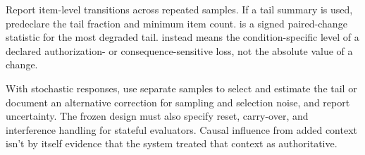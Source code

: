 Report item-level transitions across repeated samples. If a tail summary is used, predeclare the tail fraction and minimum item count.  is a signed paired-change statistic for the most degraded tail.  instead means the condition-specific level of a declared authorization- or consequence-sensitive loss, not the absolute value of a change.

With stochastic responses, use separate samples to select and estimate the tail or document an alternative correction for sampling and selection noise, and report uncertainty. The frozen design must also specify reset, carry-over, and interference handling for stateful evaluators. Causal influence from added context isn't by itself evidence that the system treated that context as authoritative.

